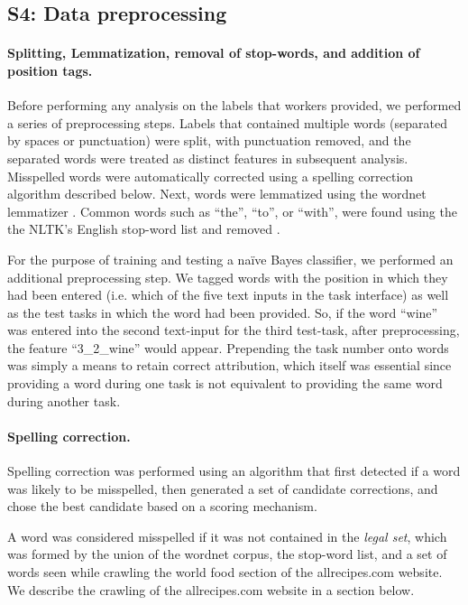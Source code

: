 \documentclass[12pt]{article}
\begin{document}
\subsection*{S4: Data preprocessing}
	\paragraph{Splitting, Lemmatization, removal of stop-words, and 
		addition of position tags.} 

	Before performing any analysis on the labels that workers provided, we
	performed a series of preprocessing steps.  
	Labels that contained
	multiple words (separated by spaces or punctuation) were split, with
	punctuation removed, and the separated words were treated as distinct 
	features in subsequent analysis.
	Misspelled words were automatically corrected using a spelling 
	correction algorithm described below.  
	Next, words were lemmatized using the
	wordnet lemmatizer \cite{miller1995wordnet,felbaum1998wordnet}.  
	Common words such as ``the'', ``to'', or ``with'', were found using the
	the NLTK's English stop-word list and removed \cite{loper2002nltk}.  

	For the purpose of training and testing a na\"ive Bayes classifier, we 
	performed an additional preprocessing step.  We tagged words with the
	position in which they had been entered (i.e. which of the five text 
	inputs in the task interface) as well as the test tasks in which the word 
	had been provided.
	So, if the word ``wine'' was entered into the second text-input for 
	the third test-task, after preprocessing, the feature ``3\_2\_wine'' would
	appear.  Prepending the task number onto words was simply a means to 
	retain correct attribution, which itself was essential since providing a
	word during one task is not equivalent to providing the same word during 
	another task.  
	
	\paragraph{Spelling correction.}  
	Spelling correction was performed using an algorithm that first detected
	if a word was likely to be misspelled, then generated a set of candidate 
	corrections, and chose the best candidate based on a scoring mechanism.
	
	A word was considered misspelled if it was not contained in the 
	\textit{legal set}, which was formed by the union of
	the wordnet corpus, the stop-word list, and a set of words seen while 
	crawling the world food section of the allrecipes.com website.  We
	describe the crawling of the allrecipes.com website in a section below.
\end{document}
